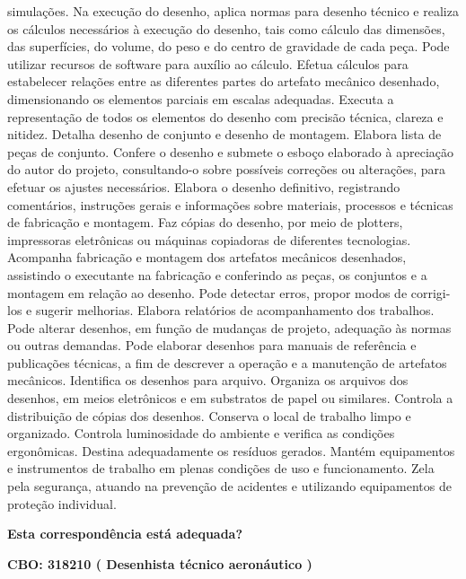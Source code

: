 \documentclass[
]{article}
\begin{document}
simulações. Na execução do desenho, aplica normas para desenho técnico e
realiza os cálculos necessários à execução do desenho, tais como cálculo
das dimensões, das superfícies, do volume, do peso e do centro de
gravidade de cada peça. Pode utilizar recursos de software para auxílio
ao cálculo. Efetua cálculos para estabelecer relações entre as
diferentes partes do artefato mecânico desenhado, dimensionando os
elementos parciais em escalas adequadas. Executa a representação de
todos os elementos do desenho com precisão técnica, clareza e nitidez.
Detalha desenho de conjunto e desenho de montagem. Elabora lista de
peças de conjunto. Confere o desenho e submete o esboço elaborado à
apreciação do autor do projeto, consultando-o sobre possíveis correções
ou alterações, para efetuar os ajustes necessários. Elabora o desenho
definitivo, registrando comentários, instruções gerais e informações
sobre materiais, processos e técnicas de fabricação e montagem. Faz
cópias do desenho, por meio de plotters, impressoras eletrônicas ou
máquinas copiadoras de diferentes tecnologias. Acompanha fabricação e
montagem dos artefatos mecânicos desenhados, assistindo o executante na
fabricação e conferindo as peças, os conjuntos e a montagem em relação
ao desenho. Pode detectar erros, propor modos de corrigi-los e sugerir
melhorias. Elabora relatórios de acompanhamento dos trabalhos. Pode
alterar desenhos, em função de mudanças de projeto, adequação às normas
ou outras demandas. Pode elaborar desenhos para manuais de referência e
publicações técnicas, a fim de descrever a operação e a manutenção de
artefatos mecânicos. Identifica os desenhos para arquivo. Organiza os
arquivos dos desenhos, em meios eletrônicos e em substratos de papel ou
similares. Controla a distribuição de cópias dos desenhos. Conserva o
local de trabalho limpo e organizado. Controla luminosidade do ambiente
e verifica as condições ergonômicas. Destina adequadamente os resíduos
gerados. Mantém equipamentos e instrumentos de trabalho em plenas
condições de uso e funcionamento. Zela pela segurança, atuando na
prevenção de acidentes e utilizando equipamentos de proteção individual.

\begin{Form}
\textbf{Esta correspondência está adequada?} \\ 
\end{Form}

\textbf{CBO: 318210  ( Desenhista técnico aeronáutico )}
\end{document}

